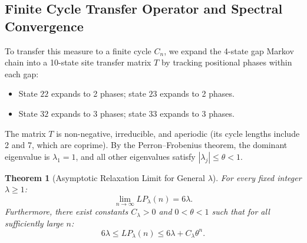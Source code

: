 \documentclass[11pt,a4paper]{article}
\newtheorem{theorem}{Theorem}[section]
\theoremstyle{definition}
\theoremstyle{remark}
\begin{document}
\subsection{Finite Cycle Transfer Operator and Spectral Convergence}

To transfer this measure to a finite cycle $C_n$, we expand the 4-state gap Markov chain into a 10-state site transfer matrix $T$ by tracking positional phases within each gap:
\begin{itemize}
    \item State $22$ expands to 2 phases; state $23$ expands to 2 phases.
    \item State $32$ expands to 3 phases; state $33$ expands to 3 phases.
\end{itemize}
The matrix $T$ is non-negative, irreducible, and aperiodic (its cycle lengths include 2 and 7, which are coprime). By the Perron--Frobenius theorem, the dominant eigenvalue is $\lambda_1 = 1$, and all other eigenvalues satisfy $|\lambda_j| \le \theta < 1$.

\begin{theorem}[Asymptotic Relaxation Limit for General $\lambda$]
\label{thm:asymptotic_lp}
For every fixed integer $\lambda \ge 1$:
\begin{equation}
    \lim_{n \to \infty} LP_\lambda(n) = 6\lambda.
\end{equation}
Furthermore, there exist constants $C_\lambda > 0$ and $0 < \theta < 1$ such that for all sufficiently large $n$:
\begin{equation}
    6\lambda \le LP_\lambda(n) \le 6\lambda + C_\lambda \theta^n.
\end{equation}
\end{theorem}
\end{document}

